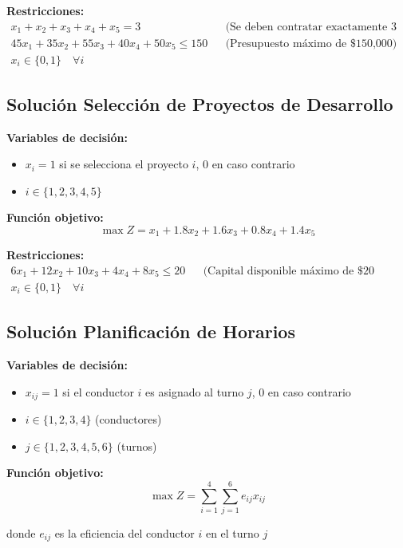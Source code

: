 \documentclass[12pt]{article}
\begin{document}
\textbf{Restricciones:}
\begin{align*}
    x_1 + x_2 + x_3 + x_4 + x_5 = 3 && \text{(Se deben contratar exactamente 3 empleados)} \\
    45x_1 + 35x_2 + 55x_3 + 40x_4 + 50x_5 \leq 150 && \text{(Presupuesto máximo de \$150,000)} \\
    x_i \in \{0,1\} \quad \forall i
\end{align*}

\subsection{Solución Selección de Proyectos de Desarrollo}

\textbf{Variables de decisión:}
\begin{itemize}
    \item $x_i = 1$ si se selecciona el proyecto $i$, 0 en caso contrario
    \item $i \in \{1, 2, 3, 4, 5\}$
\end{itemize}

\textbf{Función objetivo:}
$$\max Z = x_1 + 1.8x_2 + 1.6x_3 + 0.8x_4 + 1.4x_5$$

\textbf{Restricciones:}
\begin{align*}
    6x_1 + 12x_2 + 10x_3 + 4x_4 + 8x_5 \leq 20 && \text{(Capital disponible máximo de \$20 millones)} \\
    x_i \in \{0,1\} \quad \forall i
\end{align*}

\subsection{Solución Planificación de Horarios}

\textbf{Variables de decisión:}
\begin{itemize}
    \item $x_{ij} = 1$ si el conductor $i$ es asignado al turno $j$, 0 en caso contrario
    \item $i \in \{1, 2, 3, 4\}$ (conductores)
    \item $j \in \{1, 2, 3, 4, 5, 6\}$ (turnos)
\end{itemize}

\textbf{Función objetivo:}
$$\max Z = \sum_{i=1}^{4} \sum_{j=1}^{6} e_{ij} x_{ij}$$
\begin{center}
donde $e_{ij}$ es la eficiencia del conductor $i$ en el turno $j$
\end{center}
\end{document}
